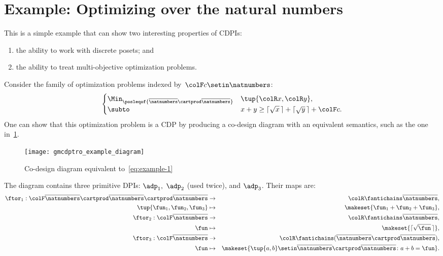 \section{Example: Optimizing over the natural numbers}

This is a simple example that can show two interesting properties of CDPIs:
\begin{enumerate}
    \item the ability to work with discrete posets; and
    \item the ability to treat multi-objective optimization problems.
\end{enumerate}
Consider the family of optimization problems indexed by~${\colF c}\setin\natnumbers$:
%
\begin{equation}
    \begin{cases}
        \Min_{\posleqof{\overline{\natnumbers}\cartprod\overline{\natnumbers}}} & \tup{ {\colR x},{\colR y}} ,                                    \\
        \subto                                                                  & x+y\geq\lceil\sqrt{x}\,\rceil+\lceil\sqrt{y}\,\rceil+{\colF c}.
    \end{cases}\label{eq:example-1}
\end{equation}
%
One can show that this optimization problem is a CDP by producing a co-design diagram with an equivalent semantics, such as the one in~\cref{fig:toydiagram}.

\begin{figure}[h]
    \centering
    \texttt{[image: gmcdptro\_example\_diagram]}
    \caption{Co-design diagram equivalent to~\cref{eq:example-1}}
    \label{fig:toydiagram}
\end{figure}

The diagram contains three primitive DPIs: $\adp_{1},$ $\adp_{2}$ (used twice), and $\adp_{3}$.
Their \ftor maps are:
\begin{eqnarray*}
    \ftor_{1}:{\colF\overline{\natnumbers}\cartprod\overline{\natnumbers}\cartprod\overline{\natnumbers}} & \rightarrow & {\colR\fantichains\overline{\natnumbers}},\\
    \tup{ \fun_{1},\fun_{2},\fun_{3}}  & \mapsto & \makeset{\fun_{1}+\fun_{2}+\fun_{3}},\\
    \ftor_{2}:{\colF\overline{\natnumbers}} & \rightarrow & {\colR\fantichains\overline{\natnumbers}},\\
    \fun& \mapsto & \makeset{\lceil\sqrt{\fun}\,\rceil},\\
    \ftor_{3}:{\colF\overline{\natnumbers}} & \rightarrow & {\colR\fantichains(\overline{\natnumbers}\cartprod\overline{\natnumbers})},\\
    \fun& \mapsto & \makeset{\tup{ a,b} \setin\overline{\natnumbers}\cartprod\overline{\natnumbers}\colon a+b=\fun}.
\end{eqnarray*}

